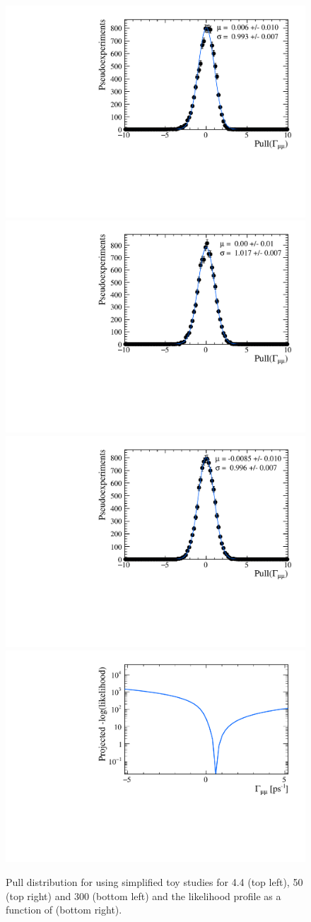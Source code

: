 
\begin{figure}[htbp]
    \centering
       \includegraphics[width=0.49 \textwidth]{./Figs/LifetimeMeasurement/CKM_simple_gamma_pull.pdf}
     \includegraphics[width= 0.49 \textwidth]{./Figs/LifetimeMeasurement/50fb_gamma_pull.pdf}
      \includegraphics[width=0.49 \textwidth]{./Figs/LifetimeMeasurement/300fb_simple_gamma_pull.pdf}
        \includegraphics[width= 0.49 \textwidth]{./Figs/LifetimeMeasurement/Gamma_LL.pdf}  

  \caption{Pull distribution for \Gmumu using simplified toy studies for 4.4 (top left), 50 (top right) and 300 (bottom left) \fb and the likelihood profile as a function of \Gmumu (bottom right).}
    \label{fig:gammapulls}
\end{figure}




